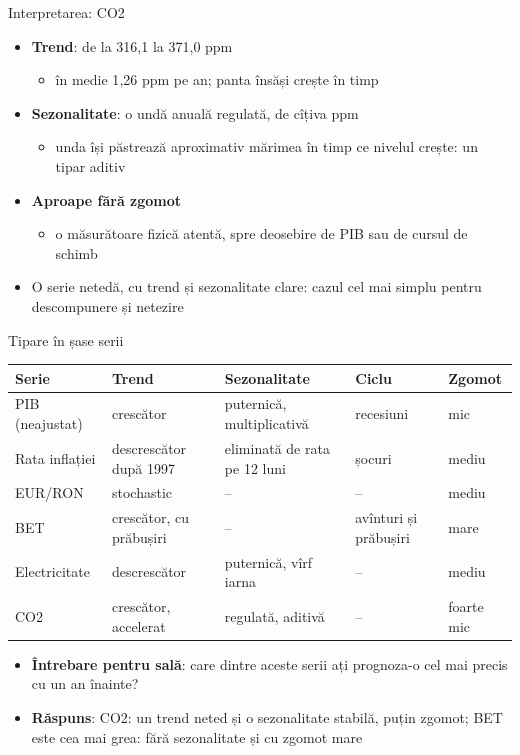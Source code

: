\begin{frame}{Interpretarea: CO2}
\itemsize{\small}
\begin{itemize}
    \item \textbf{Trend}: de la 316{,}1 la 371{,}0 ppm
    \begin{itemize}
        \item în medie 1{,}26 ppm pe an; panta însăși crește în timp
    \end{itemize}
    \item \textbf{Sezonalitate}: o undă anuală regulată, de cîțiva ppm
    \begin{itemize}
        \item unda își păstrează aproximativ mărimea în timp ce nivelul crește: un tipar aditiv
    \end{itemize}
    \item \textbf{Aproape fără zgomot}
    \begin{itemize}
        \item o măsurătoare fizică atentă, spre deosebire de PIB sau de cursul de schimb
    \end{itemize}
    \item O serie netedă, cu trend și sezonalitate clare: cazul cel mai simplu pentru descompunere și netezire
\end{itemize}
\end{frame}

\begin{frame}{Tipare în șase serii}
\itemsize{\footnotesize}
\begin{center}
\scriptsize
\begin{tabular}{lllll}
\toprule
\textbf{Serie} & \textbf{Trend} & \textbf{Sezonalitate} & \textbf{Ciclu} & \textbf{Zgomot} \\
\midrule
PIB (neajustat) & crescător & puternică, multiplicativă & recesiuni & mic \\
Rata inflației & descrescător după 1997 & eliminată de rata pe 12 luni & șocuri & mediu \\
EUR/RON & stochastic & -- & -- & mediu \\
BET & crescător, cu prăbușiri & -- & avînturi și prăbușiri & mare \\
Electricitate & descrescător & puternică, vîrf iarna & -- & mediu \\
CO2 & crescător, accelerat & regulată, aditivă & -- & foarte mic \\
\bottomrule
\end{tabular}
\end{center}
\begin{itemize}
    \item \textbf{Întrebare pentru sală}: care dintre aceste serii ați prognoza-o cel mai precis cu un an înainte?
    \pause
    \item \textbf{Răspuns}: CO2: un trend neted și o sezonalitate stabilă, puțin zgomot; BET este cea mai grea: fără sezonalitate și cu zgomot mare
\end{itemize}
\end{frame}


